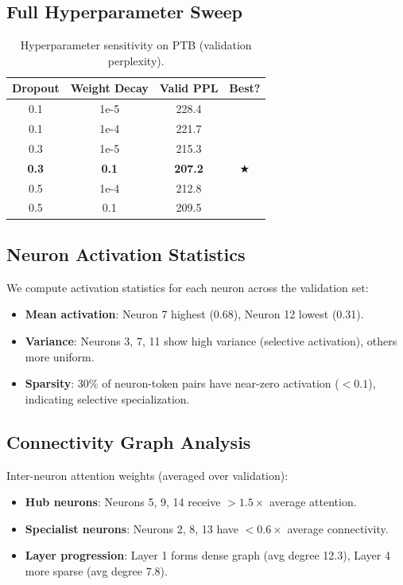 \documentclass{article}
\begin{document}
\subsection{Full Hyperparameter Sweep}

\begin{table}[h]
\centering
\caption{Hyperparameter sensitivity on PTB (validation perplexity).}
\begin{tabular}{cccc}
\toprule
\textbf{Dropout} & \textbf{Weight Decay} & \textbf{Valid PPL} & \textbf{Best?} \\
\midrule
0.1 & 1e-5 & 228.4 & \\
0.1 & 1e-4 & 221.7 & \\
0.3 & 1e-5 & 215.3 & \\
\textbf{0.3} & \textbf{0.1} & \textbf{207.2} & ★ \\
0.5 & 1e-4 & 212.8 & \\
0.5 & 0.1 & 209.5 & \\
\bottomrule
\end{tabular}
\end{table}

\subsection{Neuron Activation Statistics}

We compute activation statistics for each neuron across the validation set:
\begin{itemize}
    \item \textbf{Mean activation}: Neuron 7 highest (0.68), Neuron 12 lowest (0.31).
    \item \textbf{Variance}: Neurons 3, 7, 11 show high variance (selective activation), others more uniform.
    \item \textbf{Sparsity}: 30\% of neuron-token pairs have near-zero activation ($<0.1$), indicating selective specialization.
\end{itemize}

\subsection{Connectivity Graph Analysis}

Inter-neuron attention weights (averaged over validation):
\begin{itemize}
    \item \textbf{Hub neurons}: Neurons 5, 9, 14 receive $>1.5\times$ average attention.
    \item \textbf{Specialist neurons}: Neurons 2, 8, 13 have $<0.6\times$ average connectivity.
    \item \textbf{Layer progression}: Layer 1 forms dense graph (avg degree 12.3), Layer 4 more sparse (avg degree 7.8).
\end{itemize}
\end{document}
